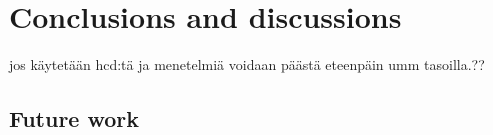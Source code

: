 \documentclass[12pt,a4paper,oneside,pdftex]{report}
\begin{document}




% 


% 










% 

\chapter{Conclusions and discussions}
\label{chapter:conclusion}

jos käytetään hcd:tä ja menetelmiä voidaan päästä eteenpäin umm tasoilla.??
        \section{Future work}
	\label{sec:future}



% 
\end{document}
